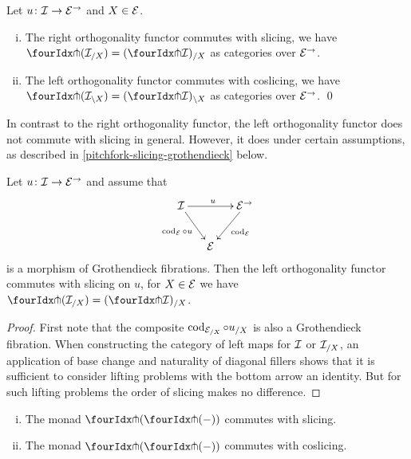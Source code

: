 \documentclass[reqno,10pt,a4paper,oneside,draft]{amsart}
\begin{document}
{{\begin{proposition} \label{pitchfork-slicing}
Let $u \co \cal{I} \to \catE^\to$ and $X \in \cal{E}$.
\begin{enumerate}[(i)]
\item The right orthogonality functor commutes with slicing, \ie we have $\liftr{(\cal{I}_{/X})} = (\liftr{\cal{I}})_{/X}$ 
as categories over $\catE^\to$.
\item The left orthogonality functor commutes with coslicing, \ie we have $\liftl{(\cal{I}_{\backslash X})} = (\liftl{\cal{I}})_{\backslash X}$
as categories over $\catE^\to$.
\qed
\end{enumerate}
\end{proposition}

In contrast to the right orthogonality functor, the left orthogonality functor does not commute with slicing in general.
However, it does under certain assumptions, as described in \cref{pitchfork-slicing-grothendieck} below. 

\begin{proposition} \label{pitchfork-slicing-grothendieck}
Let $u \co \cal{I} \to \cal{E}^\to$ and assume that
\[
\xymatrix@C-1em{
  \cal{I}
  \ar[rr]^{u}
  \ar[dr]_{\cod_{\cal{E}} \cc u}
&&
  \cal{E}^\to
  \ar[dl]^{\cod_{\cal{E}}}
\\&
  \cal{E}
}
\]
is a morphism of Grothendieck fibrations.
Then the left orthogonality functor commutes with slicing on $u$, \ie for $X \in \cal{E}$ we have
$\liftl{(\cal{I}_{/X})} = (\liftl{\cal{I}})_{/X}$.
\end{proposition}

\begin{proof}
First note that the composite $\cod_{\cal{E}_{/X}} \cc u_{/X}$ is also a Grothendieck fibration.
When constructing the category of left maps for $\cal{I}$ or $\cal{I}_{/X}$, an application of base change and naturality of diagonal fillers shows that it is sufficient to consider lifting problems with the bottom arrow an identity.
But for such lifting problems the order of slicing makes no difference.
\end{proof}



\begin{corollary} \label{pitchfork-slicing-monad}
\leavevmode
\begin{enumerate}[(i)]
\item The monad $\liftl{(\liftr{(-)})}$ commutes with slicing.
\item The monad $\liftr{(\liftl{(-)})}$ commutes with coslicing.
\end{enumerate}
\end{corollary}

}}
\end{document}
